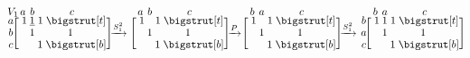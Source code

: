 \documentclass[sn-mathphys]{sn-jnl}
\newcommand\topstrut[1][1.0ex]{\setlength\bigstrutjot{#1}{\bigstrut[t]}}
\newcommand\botstrut[1][0.9ex]{\setlength\bigstrutjot{#1}{\bigstrut[b]}}
\begin{document}
\vspace{-1.8em}
$$
	\def\rowsp{0.2em}
	\def\arraystretch{0.95}
	\makeatletter\setlength\BA@colsep{1.2pt}\makeatother
	\begin{blockarray}{cccc}{V_1}
	\kern-0.2em \vspace{-0.3em} & a & b & c  \\
		\begin{block}{c[ccc]}
        a \kern\rowsp  & \; 1 &  \underline{1} & 1 \; \topstrut \\
  		b \kern\rowsp & \;  & 1 & 1 \; \\
  		c \kern\rowsp & \;  &  & 1 \; \botstrut \\
		\end{block}
	\end{blockarray}
	\xrightarrow{S_{1}^2} 
	\hspace{-0.1em}
	\, \,
	\begin{blockarray}{cccc}{}
	\kern-0.2em \vspace{-0.3em} & a & b & c  \\
		\begin{block}{c[ccc]}
  		 & \; 1 &  & 1 \; \topstrut \\
  		 & \;  & 1 & 1 \; \\
  		 & \;  &  & 1 \; \botstrut \\
		\end{block}
	\end{blockarray}
	\xrightarrow{P}
	\begin{blockarray}{cccc}{}
	\kern-0.2em \vspace{-0.3em} & b & a & c  \\
		\begin{block}{c[ccc]}
  		& \; 1 &  & 1 \; \topstrut \\
  		& \;  & 1 & 1 \; \\
  		& \;  &  & 1 \; \botstrut \\
		\end{block}
	\end{blockarray}
	\xrightarrow{S_1^2}
	\begin{blockarray}{cccc}{}
	\kern-0.2em \vspace{-0.3em} & b & a & c  \\
		\begin{block}{c[ccc]}
  		 b \kern\rowsp & \; 1 & 1 & 1 \; \topstrut \\
  		 a \kern\rowsp & \; & 1 & 1 \; \\
  		 c \kern\rowsp & \;  &  & 1 \; \botstrut \\
		\end{block}
	\end{blockarray}
$$
\end{document}
